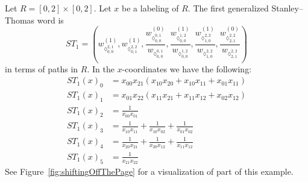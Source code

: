 \documentclass[ALCO,Unicode,published]{cedram}
\numberwithin{equation}{section}
\newcommand{\ST}{ST}
\begin{document}



\begin{Ex}
Let $R = [0,2] \times [0,2]$. Let $x$ be a labeling of $R$. The first generalized Stanley--Thomas word is
\[\ST_1 = \left(  w_{\lozenge_{0,0}^{2,1}}^{(1)}, w_{\lozenge_{0,1}^{2,2}}^{(1)}, \frac{w_{\lozenge_{0,0}^{0,1}}^{(0)}}{w_{\lozenge_{0,0}^{0,1}}}, \frac{w_{\lozenge_{0,0}^{1,2}}^{(1)}}{w_{\lozenge_{0,0}^{1,2}}}, \frac{w_{\lozenge_{1,0}^{2,2}}^{(1)}}{w_{\lozenge_{1,0}^{2,2}}}, \frac{w_{\lozenge_{2,1}^{2,2}}^{(0)}}{w_{\lozenge_{2,1}^{2,2}}}\right)\]
in terms of paths in $R$. In the $x$-coordinates we have the following:
\begin{align*}
    \ST_1(x)_0 &= x_{00}x_{21}\left(x_{10}x_{20} + x_{10}x_{11} + x_{01}x_{11}\right) \\
    \ST_1(x)_1 &= x_{01}x_{22}\left(x_{11}x_{21} + x_{11}x_{12} + x_{02}x_{12}\right) \\
    \ST_1(x)_2 &= \frac{1}{x_{00}x_{01}} \\
    \ST_1(x)_3 &= \frac{1}{x_{10}x_{11}} + \frac{1}{x_{10}x_{02}} + \frac{1}{x_{01}x_{02}} \\
    \ST_1(x)_4 &= \frac{1}{x_{20}x_{21}} + \frac{1}{x_{20}x_{12}} + \frac{1}{x_{11}x_{12}} \\
    \ST_1(x)_5 &= \frac{1}{x_{21}x_{22}}
\end{align*}
See Figure~\ref{fig:shiftingOffThePage} for a visualization of part of this example.
\end{Ex}
\end{document}
